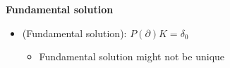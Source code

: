 \documentclass[a4paper, 11pt]{article}
\theoremstyle{definition}
\theoremstyle{remark}
\begin{document}
\textbf{Fundamental solution}
\begin{itemize}
    \item (Fundamental solution): $P(\partial) K = \delta_0$
    \begin{itemize}
        \item Fundamental solution might not be unique
    \end{itemize}
\end{itemize}
\end{document}
